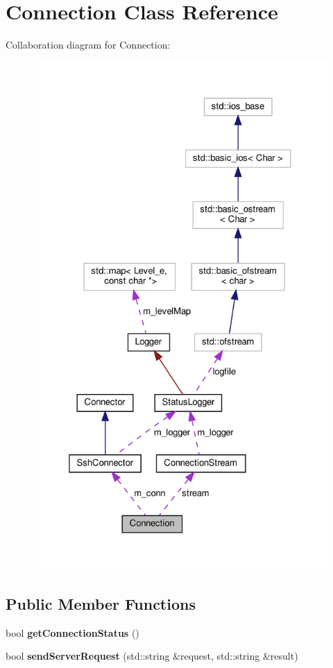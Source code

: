 \hypertarget{classConnection}{}\section{Connection Class Reference}
\label{classConnection}


Collaboration diagram for Connection\+:\nopagebreak
\begin{figure}[H]
\begin{center}
\leavevmode
\includegraphics[height=550pt]{classConnection__coll__graph}
\end{center}
\end{figure}
\subsection*{Public Member Functions}
\begin{DoxyCompactItemize}
\item 
\mbox{\label{classConnection_a4cbf33699e3ca42a23eb8168be4d5287}} 
bool {\bfseries get\+Connection\+Status} ()
\item 
\mbox{\label{classConnection_a78606e881af7bc84aca13263a6379c88}} 
bool {\bfseries send\+Server\+Request} (std\+::string \&request, std\+::string \&result)
\end{DoxyCompactItemize}
